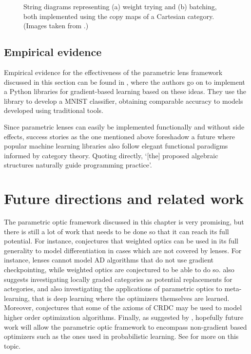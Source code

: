 \documentclass[11pt,a4paper,openright,twoside]{report}
\theoremstyle{plain}
\theoremstyle{definition}
\begin{document}
\begin{figure}[h]
\begin{center}
\begin{subfigure}{0.3\textwidth}
      \caption{}
    \end{subfigure}              
    \caption[Weight tying and batching]{String diagrams representing (a) weight trying and (b) batching, both implemented using the copy maps of a Cartesian category. (Images taken from \cite{cruttwell2022categorical}.)}
    \label{fig: weighttying}
  \end{center}
\end{figure}


\subsection{Empirical evidence}

Empirical evidence for the effectiveness of the parametric lens framework discussed in this section can be found in \cite{cruttwell2022categorical}, where the authors go on to implement a Python libraries for gradient-based learning based on these ideas. They use the library to develop a MNIST classifier, obtaining comparable accuracy to models developed using traditional tools.


Since parametric lenses can easily be implemented functionally and without side effects, success stories as the one mentioned above foreshadow a future where popular machine learning libraries also follow elegant functional paradigms informed by category theory. Quoting  \cite{cruttwell2022categorical} directly, \lq[the] proposed algebraic structures naturally guide programming practice\rq.


\section{Future directions and related work}

The parametric optic framework discussed in this chapter is very promising, but there is still a lot of work that needs to be done so that it can reach its full potential. For instance, \cite{gavranovic2024fundamental} conjectures that weighted optics can be used in its full generality to model differentiation in cases which are not covered by lenses. For instance, lenses cannot model AD algorithms that do not use gradient checkpointing, while weighted optics are conjectured to be able to do so. \cite{gavranovic2024fundamental} also suggests investigating locally graded categories as potential replacements for actegories, and also investigating the applications of parametric optics to meta-learning, that is deep learning where the optimizers themselves are learned. Moreover, \cite{cruttwell2022categorical} conjectures that some of the axioms of CRDC may be used to model higher order optimization algorithms. Finally, as suggested by \cite{cruttwell2022categorical}, hopefully future work will allow the parametric optic framework to encompass non-gradient based optimizers such as the ones used in probabilistic learning. See \cite{shiebler2021category} for more on this topic.
\end{document}
